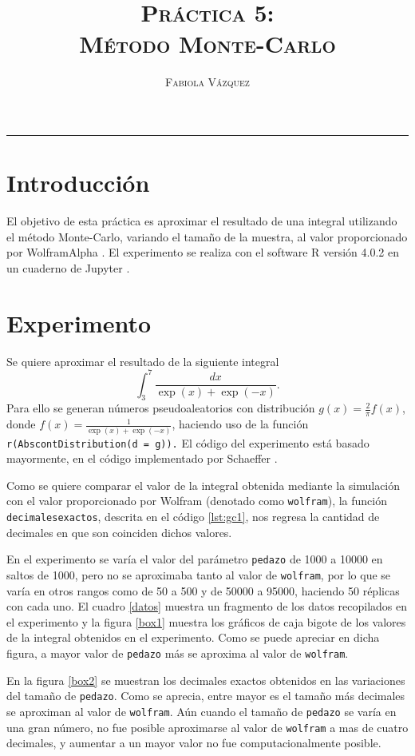 \documentclass[12pt,letterpaper]{article}
\title{\textsc{Práctica 5: \\ Método Monte-Carlo}}
\author{\textsc{Fabiola Vázquez}}
\begin{document}
\maketitle

\hrule
\section{Introducción}
El objetivo de esta práctica \cite{elisapractica5} es aproximar el resultado de una integral utilizando el método Monte-Carlo, variando el tamaño de la muestra, al valor proporcionado por WolframAlpha \cite{wolfram}. El experimento se realiza con el software R versión 4.0.2 \cite{R} en un cuaderno de Jupyter \cite{jupyter}.

\section{Experimento}
Se quiere aproximar el resultado de la siguiente integral 
\begin{equation}
\int_3^7 \frac{dx}{\exp(x) + \exp(-x)}.
\end{equation}
Para ello se generan números pseudoaleatorios con distribución $g(x)=\frac{2}{\pi}f(x)$, donde $f(x)=\frac{1}{\exp(x) + \exp(-x)}$, haciendo uso de la función \texttt{r(AbscontDistribution(d = g)).} El código del experimento \cite{fabiola} está basado mayormente, en el código implementado por Schaeffer \cite{codigoelisapractica5}. 

Como se quiere comparar el valor de la integral obtenida mediante la simulación con el valor proporcionado por Wolfram (denotado como \texttt{wolfram}), la función \texttt{decimalesexactos}, descrita en el código \ref{lst:gc1}, nos regresa la cantidad de decimales en que son coinciden dichos valores.

En el experimento se varía el valor del parámetro \texttt{pedazo} de 1000 a 10000 en saltos de 1000, pero no se aproximaba tanto al valor de \texttt{wolfram}, por lo que se varía en otros rangos como de 50 a 500 y de 50000 a 95000, haciendo 50 réplicas con cada uno. El cuadro \ref{datos} muestra un fragmento de los datos recopilados en el experimento y la figura \ref{box1} muestra los gráficos de caja bigote de los valores de la integral obtenidos en el experimento. Como se puede apreciar en dicha figura, a mayor valor de \texttt{pedazo} más se aproxima al valor de \texttt{wolfram}.

En la figura \ref{box2} se muestran los decimales exactos obtenidos en las variaciones del tamaño de \texttt{pedazo}. Como se aprecia, entre mayor es el tamaño más decimales se aproximan al valor de \texttt{wolfram}. Aún cuando el tamaño de \texttt{pedazo} se varía en una gran número, no fue posible aproximarse al valor de \texttt{wolfram} a mas de cuatro decimales, y aumentar a un mayor valor no fue computacionalmente posible. 
 
\end{document}
